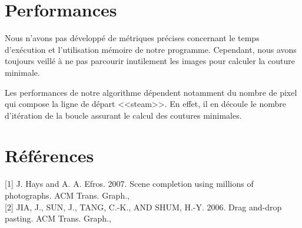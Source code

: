 \documentclass[a4paper]{article}
\begin{document}
\section{Performances}

Nous n'avons pas développé de métriques précises concernant le temps d'exécution et l'utilisation mémoire de notre programme. 
Cependant, nous avons toujours veillé à ne pas parcourir inutilement les images pour calculer la couture minimale.

Les performances de notre algorithme dépendent notamment du nombre de pixel qui compose la ligne de départ <<steam>>. En effet, il en découle le nombre d'itération de la boucle assurant le calcul des coutures minimales.

\section{Références}

[1] J. Hays and A. A. Efros.  2007. Scene completion using millions of photographs. ACM Trans. Graph.,
\\

[2] JIA, J., SUN, J., TANG, C.-K., AND SHUM, H.-Y. 2006. Drag and-drop pasting. ACM Trans. Graph.,
\end{document}
